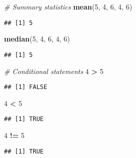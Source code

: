 \documentclass[]{article}
\newenvironment{Shaded}{\begin{snugshade}}{\end{snugshade}}
\newcommand{\KeywordTok}[1]{\textcolor[rgb]{0.13,0.29,0.53}{\textbf{#1}}}
\newcommand{\DecValTok}[1]{\textcolor[rgb]{0.00,0.00,0.81}{#1}}
\newcommand{\StringTok}[1]{\textcolor[rgb]{0.31,0.60,0.02}{#1}}
\newcommand{\CommentTok}[1]{\textcolor[rgb]{0.56,0.35,0.01}{\textit{#1}}}
\newcommand{\OperatorTok}[1]{\textcolor[rgb]{0.81,0.36,0.00}{\textbf{#1}}}
\newcommand{\NormalTok}[1]{#1}
\begin{document}
\begin{Shaded}
\begin{Highlighting}[]
\CommentTok{# Summary statistics}
\KeywordTok{mean}\NormalTok{(}\DecValTok{5}\NormalTok{, }\DecValTok{4}\NormalTok{, }\DecValTok{6}\NormalTok{, }\DecValTok{4}\NormalTok{, }\DecValTok{6}\NormalTok{)}
\end{Highlighting}
\end{Shaded}

\begin{verbatim}
## [1] 5
\end{verbatim}

\begin{Shaded}
\begin{Highlighting}[]
\KeywordTok{median}\NormalTok{(}\DecValTok{5}\NormalTok{, }\DecValTok{4}\NormalTok{, }\DecValTok{6}\NormalTok{, }\DecValTok{4}\NormalTok{, }\DecValTok{6}\NormalTok{)}
\end{Highlighting}
\end{Shaded}

\begin{verbatim}
## [1] 5
\end{verbatim}

\begin{Shaded}
\begin{Highlighting}[]
\CommentTok{# Conditional statements}
\DecValTok{4} \OperatorTok{>}\StringTok{ }\DecValTok{5}
\end{Highlighting}
\end{Shaded}

\begin{verbatim}
## [1] FALSE
\end{verbatim}

\begin{Shaded}
\begin{Highlighting}[]
\DecValTok{4} \OperatorTok{<}\StringTok{ }\DecValTok{5}
\end{Highlighting}
\end{Shaded}

\begin{verbatim}
## [1] TRUE
\end{verbatim}

\begin{Shaded}
\begin{Highlighting}[]
\DecValTok{4} \OperatorTok{!=}\StringTok{ }\DecValTok{5}
\end{Highlighting}
\end{Shaded}

\begin{verbatim}
## [1] TRUE
\end{verbatim}
\end{document}
